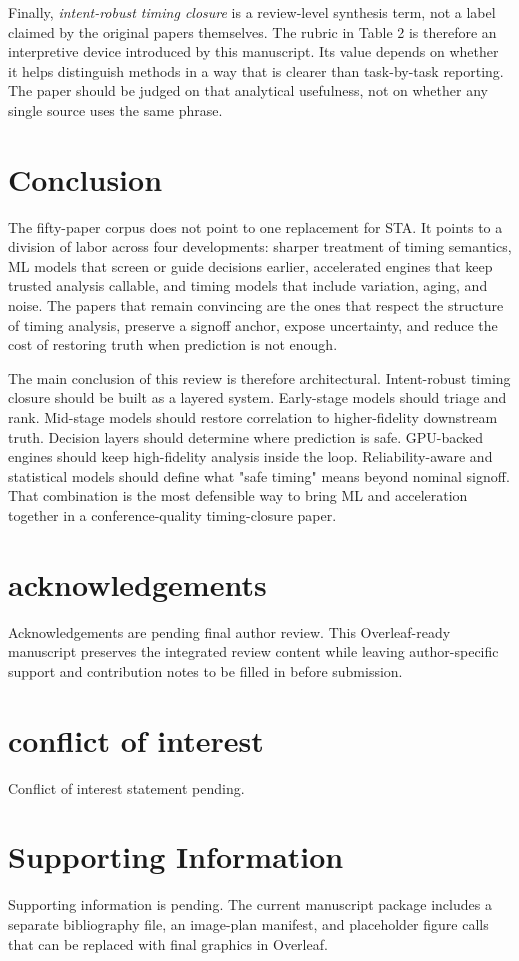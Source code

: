\documentclass[num-refs]{wiley-article}
\begin{document}
  Finally, \emph{intent-robust timing closure} is a review-level synthesis term, not a label claimed by the original papers themselves. The rubric in Table 2 is therefore an interpretive device introduced by this manuscript. Its value depends on whether it helps distinguish methods in a way that is clearer than task-by-task reporting. The paper should be judged on that analytical usefulness, not on whether any single source uses the same phrase.


  \section{Conclusion}

  The fifty-paper corpus does not point to one replacement for STA. It points to a division of labor across four developments: sharper treatment of timing semantics, ML models that screen or guide decisions earlier, accelerated engines that keep trusted analysis callable, and timing models that include variation, aging, and noise. The papers that remain convincing are the ones that respect the structure of timing analysis, preserve a signoff anchor, expose uncertainty, and reduce the cost of restoring truth when prediction is not enough.


  The main conclusion of this review is therefore architectural. Intent-robust timing closure should be built as a layered system. Early-stage models should triage and rank. Mid-stage models should restore correlation to higher-fidelity downstream truth. Decision layers should determine where prediction is safe. GPU-backed engines should keep high-fidelity analysis inside the loop. Reliability-aware and statistical models should define what "safe timing" means beyond nominal signoff. That combination is the most defensible way to bring ML and acceleration together in a conference-quality timing-closure paper.


  \section*{acknowledgements}

  Acknowledgements are pending final author review. This Overleaf-ready manuscript preserves the integrated review content while leaving author-specific support and contribution notes to be filled in before submission.


  \section*{conflict of interest}

  Conflict of interest statement pending.


  \section*{Supporting Information}

  Supporting information is pending. The current manuscript package includes a separate bibliography file, an image-plan manifest, and placeholder figure calls that can be replaced with final graphics in Overleaf.


  \printendnotes


  

  
\end{document}
